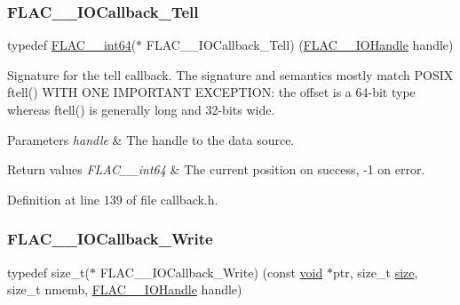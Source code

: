 \subsubsection{\texorpdfstring{FLAC\_\_IOCallback\_Tell}{FLAC\_\_IOCallback\_Tell}}
{\footnotesize\ttfamily typedef \mbox{\hyperlink{ordinals_8h_a12b57f75f760b9062a13bcda1bdb3f3e}{F\+L\+A\+C\+\_\+\+\_\+int64}}($\ast$ F\+L\+A\+C\+\_\+\+\_\+\+I\+O\+Callback\+\_\+\+Tell) (\mbox{\hyperlink{group__flac__callbacks_ga4c329c3168dee6e352384c5e9306260d}{F\+L\+A\+C\+\_\+\+\_\+\+I\+O\+Handle}} handle)}

Signature for the tell callback. The signature and semantics mostly match P\+O\+S\+IX ftell() W\+I\+TH O\+NE I\+M\+P\+O\+R\+T\+A\+NT E\+X\+C\+E\+P\+T\+I\+ON\+: the offset is a 64-\/bit type whereas ftell() is generally \textquotesingle{}long\textquotesingle{} and 32-\/bits wide.


\begin{DoxyParams}{Parameters}
{\em handle} & The handle to the data source. \\
\hline
\end{DoxyParams}

\begin{DoxyRetVals}{Return values}
{\em F\+L\+A\+C\+\_\+\+\_\+int64} & The current position on success, {\ttfamily -\/1} on error. \\
\hline
\end{DoxyRetVals}


Definition at line 139 of file callback.\+h.

\mbox{\label{group__flac__callbacks_gad991792235879aecae289b56a112e1b8}} 
\subsubsection{\texorpdfstring{FLAC\_\_IOCallback\_Write}{FLAC\_\_IOCallback\_Write}}
{\footnotesize\ttfamily typedef size\+\_\+t($\ast$ F\+L\+A\+C\+\_\+\+\_\+\+I\+O\+Callback\+\_\+\+Write) (const \mbox{\hyperlink{_s_d_l__opengles2__gl2ext_8h_ae5d8fa23ad07c48bb609509eae494c95}{void}} $\ast$ptr, size\+\_\+t \mbox{\hyperlink{_s_d_l__opengl__glext_8h_a3d1e3edfcf61ca2d831883e1afbad89e}{size}}, size\+\_\+t nmemb, \mbox{\hyperlink{group__flac__callbacks_ga4c329c3168dee6e352384c5e9306260d}{F\+L\+A\+C\+\_\+\+\_\+\+I\+O\+Handle}} handle)}

